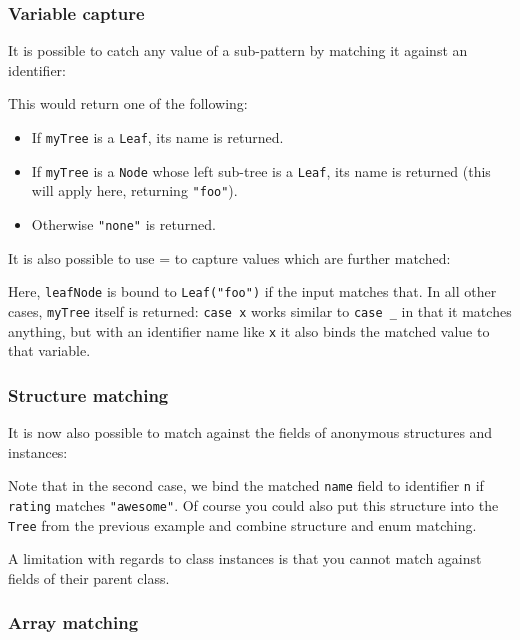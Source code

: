 \documentclass{article}
\newcommand{\type}[1]{\texttt{#1}}
\newcommand{\expr}[1]{\texttt{#1}}
\begin{document}
\subsubsection{Variable capture}

It is possible to catch any value of a sub-pattern by matching it against an identifier:



This would return one of the following:

\begin{itemize}
	\item If \expr{myTree} is a \expr{Leaf}, its name is returned.
	\item If \expr{myTree} is a \expr{Node} whose left sub-tree is a \expr{Leaf}, its name is returned (this will apply here, returning \expr{"foo"}).
	\item Otherwise \expr{"none"} is returned.
\end{itemize}

It is also possible to use = to capture values which are further matched:



Here, \expr{leafNode} is bound to \expr{Leaf("foo")} if the input matches that. In all other cases, \expr{myTree} itself is returned: \expr{case x} works similar to \expr{case _} in that it matches anything, but with an identifier name like \expr{x} it also binds the matched value to that variable.

\subsubsection{Structure matching}

It is now also possible to match against the fields of anonymous structures and instances:



Note that in the second case, we bind the matched \expr{name} field to identifier \expr{n} if \expr{rating} matches \expr{"awesome"}. Of course you could also put this structure into the \type{Tree} from the previous example and combine structure and enum matching.

A limitation with regards to class instances is that you cannot match against fields of their parent class.

\subsubsection{Array matching}
\end{document}
